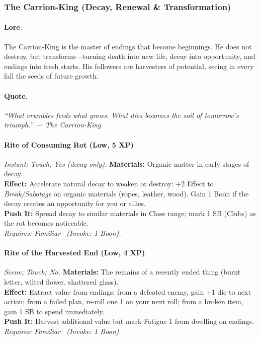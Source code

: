 \subsubsection{The Carrion-King (Decay, Renewal \& Transformation)}

\paragraph{Lore.}
The Carrion-King is the master of endings that become beginnings. He does not destroy, but transforms—turning death into new life, decay into opportunity, and endings into fresh starts. His followers are harvesters of potential, seeing in every fall the seeds of future growth.

\paragraph{Quote.}
\emph{``What crumbles feeds what grows. What dies becomes the soil of tomorrow's triumph.'' — The Carrion-King}

\paragraph{Rite of Consuming Rot (Low, 5 XP)} \emph{Instant; Touch; Yes (decay only).}
\textbf{Materials:} Organic matter in early stages of decay. \\
\textbf{Effect:} Accelerate natural decay to weaken or destroy: +2 Effect to \emph{Break/Sabotage} on organic materials (ropes, leather, wood). Gain 1 Boon if the decay creates an opportunity for you or allies. \\
\textbf{Push It:} Spread decay to similar materials in Close range; mark 1 SB (Clubs) as the rot becomes noticeable. \\
\emph{Requires: Familiar \ (\textit{Invoke:} 1 Boon).}

\paragraph{Rite of the Harvested End (Low, 4 XP)} \emph{Scene; Touch; No.}
\textbf{Materials:} The remains of a recently ended thing (burnt letter, wilted flower, shattered glass). \\
\textbf{Effect:} Extract value from endings: from a defeated enemy, gain +1 die to next action; from a failed plan, re-roll one 1 on your next roll; from a broken item, gain 1 SB to spend immediately. \\
\textbf{Push It:} Harvest additional value but mark Fatigue 1 from dwelling on endings. \\
\emph{Requires: Familiar \ (\textit{Invoke:} 1 Boon).}

